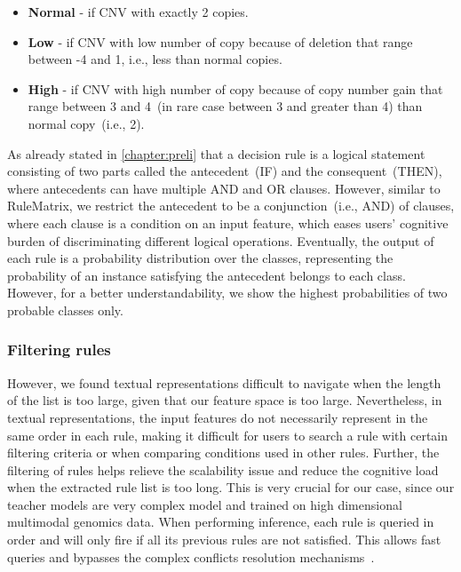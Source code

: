 \vspace{-2mm}
\begin{itemize}[noitemsep]
    \item \textbf{Normal} - if CNV with exactly 2 copies.
    \item\textbf{Low} - if CNV with low number of copy because of deletion that range between -4 and 1, i.e., less than normal copies.
    \item\textbf{High} - if CNV with high number of copy because of copy number gain that range between 3 and 4~(in rare case between 3 and greater than 4) than normal copy~(i.e., 2).
\end{itemize}
\vspace{-2mm}

\hspace*{3.5mm} As already stated in \cref{chapter:preli} that a decision rule is a logical statement consisting of two parts called the antecedent~(IF) and the consequent~(THEN), where antecedents can have multiple AND and OR clauses. However, similar to RuleMatrix, we restrict the antecedent to be a conjunction~(i.e., AND) of clauses, where each clause is a condition on an input feature, which eases users' cognitive burden of discriminating different logical operations. Eventually, the output of each rule is a probability distribution over the classes, representing the probability of an instance satisfying the antecedent belongs to each class. However, for a better understandability, we show the highest probabilities of two probable classes only. 

\subsubsection{Filtering rules}
However, we found textual representations difficult to navigate when the length of the list is too large, given that our feature space is too large. Nevertheless, in textual representations, the input features do not necessarily represent in the same order in each rule, making it  difficult for users to search a rule with certain filtering criteria or when comparing conditions used in other rules. 
Further, the filtering of rules helps relieve the scalability issue and reduce the cognitive load when the extracted rule list is too long. This is very crucial for our case, since our teacher models are very complex model and trained on high dimensional multimodal genomics data. 
When performing inference, each rule is queried in order and will only fire if all its previous rules are not satisfied. This allows fast queries and bypasses the complex conflicts resolution mechanisms~\cite{ribeiro2018anchors}.

